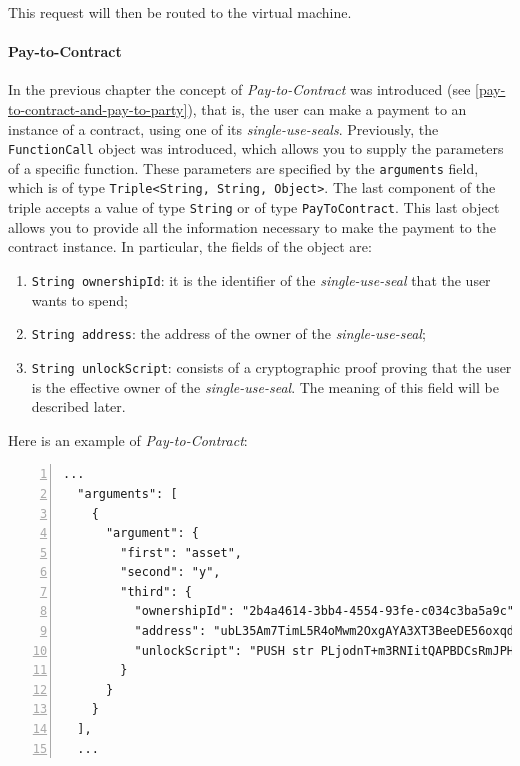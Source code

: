This request will then be routed to the virtual machine.

\paragraph{Pay-to-Contract}
\label{pay-to-contract}

In the previous chapter the concept of \textit{Pay-to-Contract} was introduced (see 
\ref{pay-to-contract-and-pay-to-party}), that is, the user can make a payment to an instance of a 
contract, using one of its \textit{single-use-seals}. Previously, the \verb|FunctionCall| object was 
introduced, which allows you to supply the parameters of a specific function. These parameters are 
specified by the \verb|arguments| field, which is of type \verb|Triple<String, String, Object>|. The last 
component of the triple accepts a value of type \verb|String| or of type \verb|PayToContract|. This last 
object allows you to provide all the information necessary to make the payment to the contract instance. 
In particular, the fields of the object are:
\label{ownership}
\begin{enumerate}
   \item \verb|String ownershipId|: it is the identifier of the \textit{single-use-seal} that the user 
   wants to spend;
   \item \verb|String address|: the address of the owner of the \textit{single-use-seal};
   \item \verb|String unlockScript|: consists of a cryptographic proof proving that the user is the 
   effective owner of the \textit{single-use-seal}. The meaning of this field will be described later.
\end{enumerate}

Here is an example of \textit{Pay-to-Contract}:

\begin{Verbatim}[numbers=left,xleftmargin=1cm,firstnumber=1,breaklines=true,breakanywhere=true,tabsize=2]
  ...
  "arguments": [
    {
      "argument": {
        "first": "asset",
        "second": "y",
        "third": {
          "ownershipId": "2b4a4614-3bb4-4554-93fe-c034c3ba5a9c",
          "address": "ubL35Am7TimL5R4oMwm2OxgAYA3XT3BeeDE56oxqdLc=",
          "unlockScript": "PUSH str PLjodnT+m3RNIitQAPBDCsRmJPHCqrwZOY/CPiHFZGnl+DRN6soqxMy3ehTFaUwxBjjf7qfBfvTDq5oBItTFrtz1Rn5SDS1ybdbkwpKaOXVglNOw7ZEG9bbZ1mo1oA7IAjRiIilzUetCstE5rPZIf9XOXr/RQ5AHkZUn2CztsvA=\nPUSH str MIGfMA0GCSqGSIb3DQEBAQUAA4GNADCBiQKBgQCo/GjVKS+3gAA55+kko41yINdOcCLQMSBQyuTTkKHE1mhu/TgOpivM0wLPsSga8hQMr3+v3aR0IF/vfCRf6SdiXmWx/jflmEXtnT6fkGcnV6dGNUpHWXSpwUIDt0N88jfnEqekx4S+KDCKg99sGEeHeT65fKS8lB0gjHMt9AOriwIDAQAB\n"
        }
      }
    }
  ],
  ...
\end{Verbatim}

